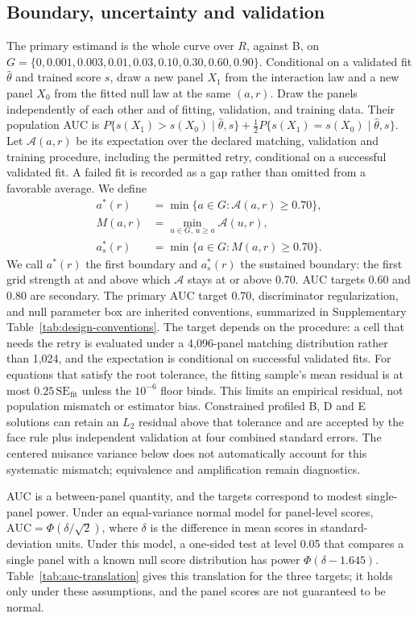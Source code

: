 \subsection{Boundary, uncertainty and validation}

The primary estimand is the whole curve over $R$, against B, on $G=\{0,0.001,0.003,0.01,0.03,0.10,0.30,0.60,0.90\}$. %
Conditional on a validated fit $\hat\theta$ and trained score $s$, draw a new panel $X_1$ from the interaction law and a new panel $X_0$ from the fitted null law at the same $(a,r)$. Draw the panels independently of each other and of fitting, validation, and training data. %
Their population AUC is $P\{s(X_1)>s(X_0)\mid\hat\theta,s\}+\tfrac12P\{s(X_1)=s(X_0)\mid\hat\theta,s\}$. Let $\mathcal A(a,r)$ be its expectation over the declared matching, validation and training procedure, including the permitted retry, conditional on a successful validated fit. %
A failed fit is recorded as a gap rather than omitted from a favorable average. %
We define
\begin{align}
a^*(r)&=\min\{a\in G:\mathcal A(a,r)\geq0.70\},\\
M(a,r)&=\min_{u\in G,\,u\geq a}\mathcal A(u,r),\\
a_s^*(r)&=\min\{a\in G:M(a,r)\geq0.70\}.
\end{align}
We call $a^*(r)$ the first boundary and $a_s^*(r)$ the sustained boundary: the first grid strength at and above which $\mathcal A$ stays at or above 0.70. %
AUC targets 0.60 and 0.80 are secondary. %
The primary AUC target 0.70, discriminator regularization, and null parameter box are inherited conventions, summarized in Supplementary Table~\ref{tab:design-conventions}. %
The target depends on the procedure: a cell that needs the retry is evaluated under a 4,096-panel matching distribution rather than 1,024, and the expectation is conditional on successful validated fits. %
For equations that satisfy the root tolerance, the fitting sample's mean residual is at most $0.25\,\mathrm{SE}_{\mathrm{fit}}$ unless the $10^{-6}$ floor binds. This limits an empirical residual, not population mismatch or estimator bias. Constrained profiled B, D and E solutions can retain an $L_2$ residual above that tolerance and are accepted by the face rule plus independent validation at four combined standard errors. The centered nuisance variance below does not automatically account for this systematic mismatch; equivalence and amplification remain diagnostics. %

AUC is a between-panel quantity, and the targets correspond to modest single-panel power. %
Under an equal-variance normal model for panel-level scores, $\mathrm{AUC}=\Phi(\delta/\sqrt2)$, where $\delta$ is the difference in mean scores in standard-deviation units. Under this model, a one-sided test at level 0.05 that compares a single panel with a known null score distribution has power $\Phi(\delta-1.645)$. %
Table~\ref{tab:auc-translation} gives this translation for the three targets; it holds only under these assumptions, and the panel scores are not guaranteed to be normal. %

